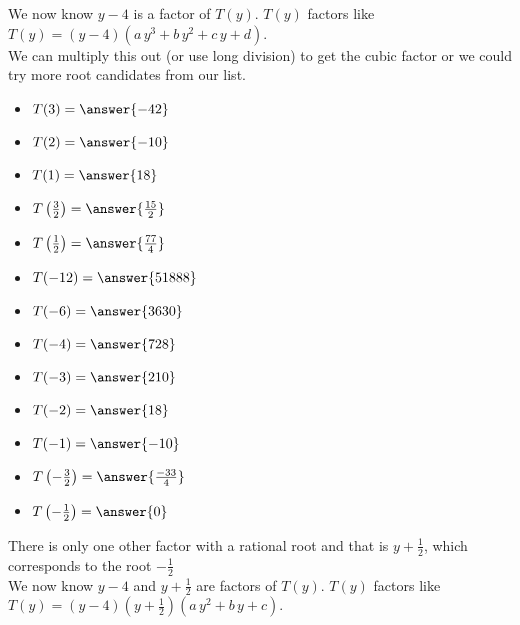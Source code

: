\documentclass{ximera}
\begin{document}
\begin{example}
We now know $y-4$ is a factor of $T(y)$.  $T(y)$ factors like $T(y) = (y-4) (a \, y^3 + b \, y^2 + c \, y + d)$. \\

We can  multiply this out (or use long division) to get the cubic factor or we could try more root candidates from our list.


\begin{itemize}
\item $T(3) =  \answer{-42}$  \\
\item $T(2) =  \answer{-10}$  \\
\item $T(1) =  \answer{18}$  \\
\item $T\left(\tfrac{3}{2}\right) =  \answer{\tfrac{15}{2}}$  \\
\item $T\left(\tfrac{1}{2}\right) =  \answer{\tfrac{77}{4}}$  \\
\item $T(-12) =  \answer{51888}$  \\
\item $T(-6) =  \answer{3630}$  \\
\item $T(-4) =  \answer{728}$  \\
\item $T(-3) =  \answer{210}$  \\
\item $T(-2) =  \answer{18}$  \\
\item $T(-1) =  \answer{-10}$  \\
\item $T\left(-\tfrac{3}{2}\right) =  \answer{\tfrac{-33}{4}}$  \\
\item $T\left(-\tfrac{1}{2}\right) =  \answer{0}$  
\end{itemize}

There is only one other factor with a rational root and that is $y+\frac{1}{2}$, which corresponds to the root $-\frac{1}{2}$ \\



We now know $y-4$ and $y+\frac{1}{2}$ are factors of $T(y)$.  $T(y)$ factors like $T(y) = (y-4) \left(y+\frac{1}{2}\right) (a \, y^2 + b \, y + c)$. \\





\end{example}
\end{document}
